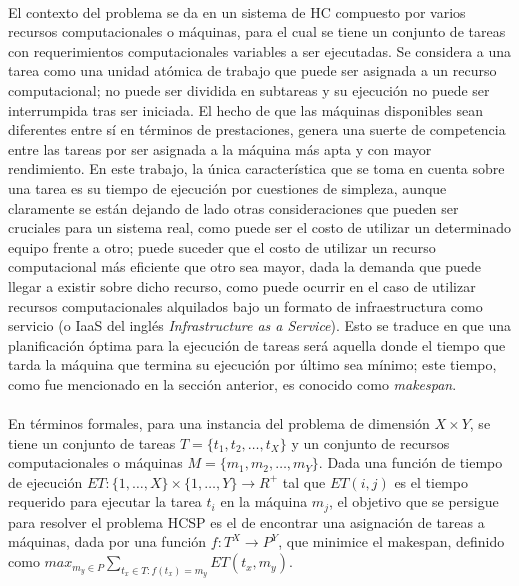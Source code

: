 \paragraph{}El contexto del problema se da en un sistema de HC compuesto por varios recursos computacionales o máquinas, para el cual se tiene un conjunto de tareas con requerimientos computacionales variables a ser ejecutadas.
Se considera a una tarea como una unidad atómica de trabajo que puede ser asignada a un recurso computacional; no puede ser dividida en subtareas y su ejecución no puede ser interrumpida tras ser iniciada.
El hecho de que las máquinas disponibles sean diferentes entre sí en términos de prestaciones, genera una suerte de competencia entre las tareas por ser asignada a la máquina más apta y con mayor rendimiento.
En este trabajo, la única característica que se toma en cuenta sobre una tarea es su tiempo de ejecución por cuestiones de simpleza, aunque claramente se están dejando de lado otras consideraciones que pueden ser cruciales para un sistema real, como puede ser el costo de utilizar un determinado equipo frente a otro; puede suceder que el costo de utilizar un recurso computacional más eficiente que otro sea mayor, dada la demanda que puede llegar a existir sobre dicho recurso, como puede ocurrir en el caso de utilizar recursos computacionales alquilados bajo un formato de infraestructura como servicio (o IaaS del inglés \textit{Infrastructure as a Service}). 
Esto se traduce en que una planificación óptima para la ejecución de tareas será aquella donde el tiempo que tarda la máquina que termina su ejecución por último sea mínimo; este tiempo, como fue mencionado en la sección anterior, es conocido como \textit{makespan}.

\paragraph{}En términos formales, para una instancia del problema de dimensión $X\times Y$, se tiene un conjunto de tareas $T = \{t_1,t_2,\dots,t_X\}$ y un conjunto de recursos computacionales o máquinas $M = \{m_1,m_2,\dots,m_Y \}$. Dada una función de tiempo de ejecución $ET : \{1,\dots,X\} \times \{1,\dots,Y\} \rightarrow R^+$ tal que $ET(i,j)$ es el tiempo requerido para ejecutar la tarea $t_i$ en la máquina $m_j$, el objetivo que se persigue para resolver el problema HCSP es el de encontrar una asignación de tareas a máquinas, dada por una función $f: T^X \rightarrow P^Y$, que minimice el makespan, definido como $max_{m_y \in P} \sum_{t_x \in T: f(t_x)=m_y} ET(t_x, m_y)$.

